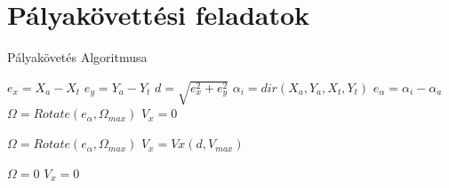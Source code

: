 \section{Pályakövettési feladatok}

\begin{algorithm}
   \caption{Pályakövetés Algoritmusa}
    \begin{algorithmic}[1]
      
       \State $e_x = X_a-X_t$
       \State $e_y = Y_a-Y_t$
       \State $d=\sqrt{e_x^2+e_y^2}$
       \State $\alpha_i=dir(X_a,Y_a,X_t,Y_t)$ 
       \State $e_\alpha=\alpha_i-\alpha_a$
             
                \State $\Omega = Rotate(e_\alpha,\Omega_{max}) $
                \State $V_x = 0 $
            \Else {}
                
                \State $\Omega = Rotate(e_\alpha,\Omega_{max}) $
                \State $V_x = Vx(d,V_{max}) $
            \EndIf
     
             
                \State $\Omega = 0$
                \State $V_x = 0 $
            \EndIf
        
       \EndFunction

\end{algorithmic}
\end{algorithm}
